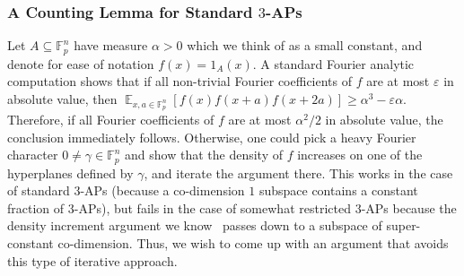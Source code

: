 \documentclass[10pt,a4paper]{amsart}
\newcommand\Expect[2]{{\mathop{\mathbb{E}}_{#1}\left[ {#2} \right]}}
\newcommand\eps{\varepsilon}
\renewcommand\geq{\geqslant}
\begin{document}
\subsubsection{A Counting Lemma for Standard \texorpdfstring{$3$}{3}-APs}
Let $A\subseteq \mathbb{F}_p^n$ have measure $\alpha>0$ which we think of as a small constant, and denote for ease of notation $f(x) = 1_A(x)$. 
A standard Fourier analytic computation shows that if all non-trivial Fourier coefficients of $f$ are at most $\eps$ in absolute value, then 
$\Expect{x,a\in\mathbb{F}_p^{n}}{f(x)f(x+a)f(x+2a)}\geq \alpha^3 - \eps\alpha$. 
Therefore, if all Fourier coefficients of $f$ are at most $\alpha^2/2$ in absolute value, the conclusion immediately follows. Otherwise, one could pick a heavy Fourier character $0\neq \gamma\in\mathbb{F}_p^n$ and show that the density of $f$ increases on one of the hyperplanes defined by $\gamma$, and iterate the argument there. This works in the case of standard $3$-APs (because a co-dimension $1$ subspace contains a constant fraction of $3$-APs), but fails in the case of somewhat restricted $3$-APs because the density increment argument we know~\cite{BKM3AP} passes down to a subspace of super-constant co-dimension. Thus, we wish to come up with an argument that avoids this type of iterative approach.
\end{document}
